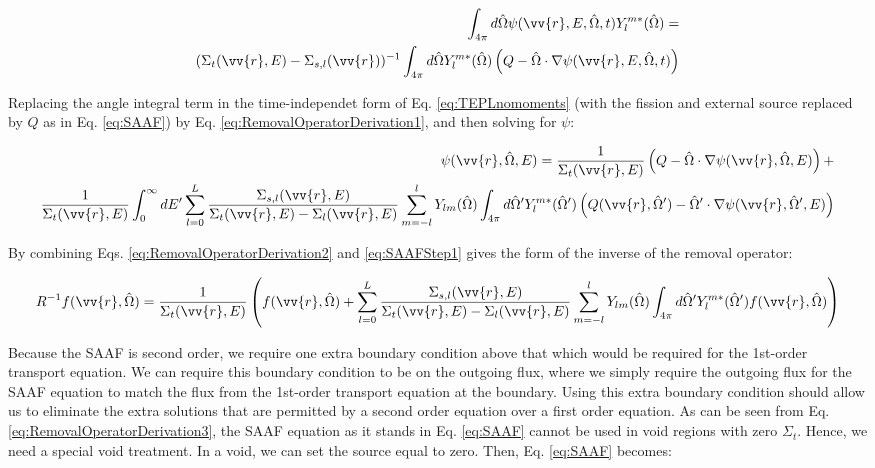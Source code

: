 \documentclass[10pt]{article}
\newcommand{\hO}{\hat{\Omega}}
\newcommand{\spa}{(\vv{r}, E, \hO, t)}
\begin{document}
\begin{flushleft}
\begin{equation}
\label{eq:RemovalOperatorDerivation1}
\begin{aligned}
 \int_{4\pi}^{}d\hO   \psi\spa Y_l^{m*}(\hO  ) = \\
 (\Sigma_t(\vv{r},E) - \Sigma_{s,l}(\vv{r}))^{-1}\int_{4\pi}^{} d\hO  Y_l^{m*}(\hO  ) \left(Q - \hO  \cdot\nabla\psi\spa \right)
\end{aligned}
\end{equation}

Replacing the angle integral term in the time-independet form of Eq. \ref{eq:TEPLnomoments} (with the fission and external source replaced by \(Q\) as in Eq. \ref{eq:SAAF}) by Eq. \ref{eq:RemovalOperatorDerivation1}, and then solving for \(\psi\):

\begin{equation}
\label{eq:RemovalOperatorDerivation2}
\begin{aligned}
\psi(\vv{r}, \hO  , E) = \frac{1} {\Sigma_t(\vv{r}, E)} \left(Q - \hO  \cdot\nabla\psi(\vv{r}, \hO  , E)\right) +\\
\frac{1}{\Sigma_t(\vv{r}, E)} \int_{0}^{\infty}dE' \sum_{l=0}^{L} \frac{\Sigma_{s,l}(\vv{r}, E)}{\Sigma_t(\vv{r}, E) - \Sigma_l(\vv{r}, E)} \sum_{m=-l}^{l}  Y_{lm}(\hO  ) \int_{4\pi}^{} d\hO  ' Y_l^{m*}(\hO  ') \left(Q(\vv{r}, \hO  ') - \hO  '\cdot\nabla\psi(\vv{r}, \hO  ', E)\right)
\end{aligned}
\end{equation}

By combining Eqs. \ref{eq:RemovalOperatorDerivation2} and \ref{eq:SAAFStep1} gives the form of the inverse of the removal operator:

\begin{equation}
\label{eq:RemovalOperatorDerivation3}
R^{-1} f(\vv{r}, \hO  ) = \frac{1}{\Sigma_t(\vv{r}, E)} \left(f(\vv{r}, \hO  ) + \sum_{l=0}^{L} \frac{\Sigma_{s,l}(\vv{r}, E)}{\Sigma_t(\vv{r}, E) - \Sigma_l(\vv{r}, E)}\sum_{m=-l}^{l}  Y_{lm}(\hO  )\int_{4\pi}^{} d\hO  ' Y_l^{m*}(\hO  ') f(\vv{r}, \hO  )\right)
\end{equation}

Because the SAAF is second order, we require one extra boundary condition above that which would be required for the 1st-order transport equation. We can require this boundary condition to be on the outgoing flux, where we simply require the outgoing flux for the SAAF equation to match the flux from the 1st-order transport equation at the boundary. Using this extra boundary condition should allow us to eliminate the extra solutions that are permitted by a second order equation over a first order equation. As can be seen from Eq. \ref{eq:RemovalOperatorDerivation3}, the SAAF equation as it stands in Eq. \ref{eq:SAAF} cannot be used in void regions with zero \(\Sigma_t\). Hence, we need a special void treatment. In a void, we can set the source equal to zero. Then, Eq. \ref{eq:SAAF} becomes:


\end{flushleft}
\end{document}
